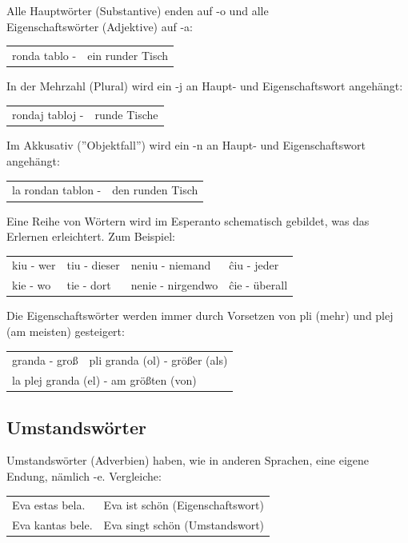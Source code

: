 Alle Hauptwörter (Substantive) enden auf -o und alle \\ Eigenschaftswörter (Adjektive) auf -a:

\begin{tabular}{ll}
ronda tablo -& ein runder Tisch
\end{tabular}

In der Mehrzahl (Plural) wird ein -j an Haupt- und Eigenschaftswort angehängt:

\begin{tabular}{ll}
rondaj tabloj -& runde Tische
\end{tabular}

Im Akkusativ (''Objektfall'') wird ein -n an Haupt- und Eigenschaftswort angehängt:

\begin{tabular}{ll}
	la rondan tablon -& den runden Tisch
\end{tabular}

Eine Reihe von Wörtern wird im Esperanto schematisch gebildet, was das Erlernen erleichtert. Zum Beispiel:

\begin{tabular}{llll}
	kiu - wer   &tiu - dieser   &neniu - niemand  &ĉiu - jeder\\
	kie - wo    &tie - dort     &nenie - nirgendwo&ĉie - überall
\end{tabular}

Die Eigenschaftswörter werden immer durch Vorsetzen von pli (mehr) und plej (am meisten) gesteigert:

\begin{tabular}{ll}
granda - groß  & pli granda (ol) - größer (als)  \\ \multicolumn{2}{l}{la plej granda (el) - am größten (von)}
\end{tabular}

\vspace{-.3cm}

\subsection{Umstandswörter}

\vspace{-.1cm}

Umstandswörter (Adverbien) haben, wie in anderen Sprachen, eine eigene Endung, nämlich -e.
Vergleiche:

\begin{tabular}{ll}
Eva estas bela. & Eva ist schön (Eigenschaftswort)\\
Eva kantas bele. & Eva singt schön (Umstandswort)
\end{tabular}

